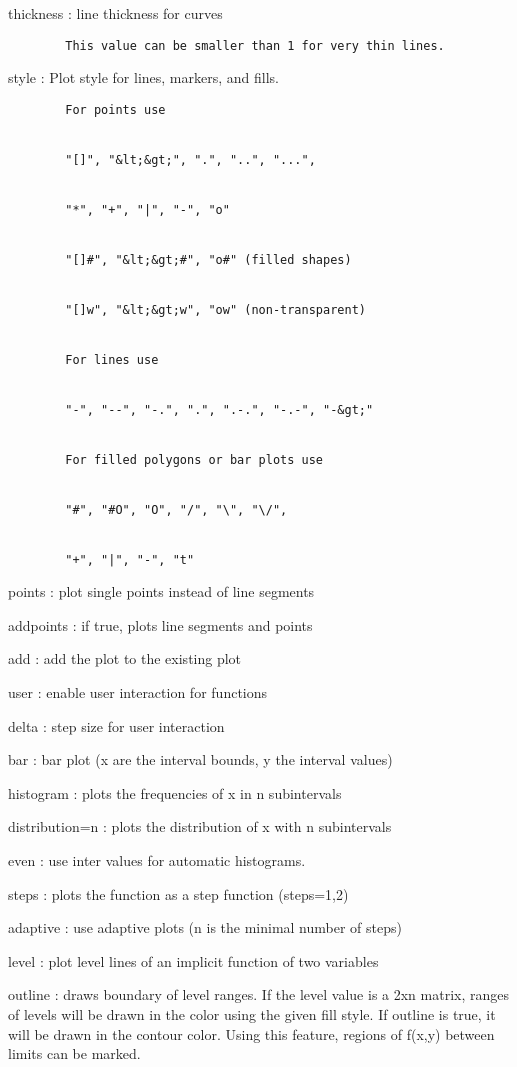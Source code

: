 \documentclass[
]{book}
\begin{document}
thickness : line thickness for curves

\begin{verbatim}
        This value can be smaller than 1 for very thin lines.
\end{verbatim}

style : Plot style for lines, markers, and fills.

\begin{verbatim}
        For points use


        "[]", "&lt;&gt;", ".", "..", "...",


        "*", "+", "|", "-", "o"


        "[]#", "&lt;&gt;#", "o#" (filled shapes)


        "[]w", "&lt;&gt;w", "ow" (non-transparent)


        For lines use


        "-", "--", "-.", ".", ".-.", "-.-", "-&gt;"


        For filled polygons or bar plots use


        "#", "#O", "O", "/", "\", "\/",


        "+", "|", "-", "t"
\end{verbatim}

points : plot single points instead of line segments

addpoints : if true, plots line segments and points

add : add the plot to the existing plot

user : enable user interaction for functions

delta : step size for user interaction

bar : bar plot (x are the interval bounds, y the interval values)

histogram : plots the frequencies of x in n subintervals

distribution=n : plots the distribution of x with n subintervals

even : use inter values for automatic histograms.

steps : plots the function as a step function (steps=1,2)

adaptive : use adaptive plots (n is the minimal number of steps)

level : plot level lines of an implicit function of two variables

outline : draws boundary of level ranges. If the level value is a 2xn matrix, ranges of levels will be drawn in the color using the given fill style. If outline is true, it will be drawn in the contour color. Using this feature, regions of f(x,y) between limits can be marked.
\end{document}
